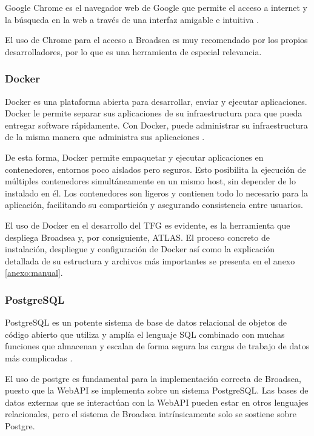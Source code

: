 Google Chrome es el navegador web de Google que permite el acceso a internet y la búsqueda en la web a través de una interfaz amigable e intuitiva \cite{GoogleChrome}. 

El uso de Chrome para el acceso a Broadsea es muy recomendado por los propios desarrolladores, por lo que es una herramienta de especial relevancia.

\subsubsection{Docker}

Docker es una plataforma abierta para desarrollar, enviar y ejecutar aplicaciones. Docker le permite separar sus aplicaciones de su infraestructura para que pueda entregar software rápidamente. Con Docker, puede administrar su infraestructura de la misma manera que administra sus aplicaciones \cite{DockerWebsite}.

De esta forma, Docker permite empaquetar y ejecutar aplicaciones en contenedores, entornos poco aislados pero seguros. Esto posibilita la ejecución de múltiples contenedores simultáneamente en un mismo host, sin depender de lo instalado en él. Los contenedores son ligeros y contienen todo lo necesario para la aplicación, facilitando su compartición y asegurando consistencia entre usuarios. 

El uso de Docker en el desarrollo del TFG es evidente, es la herramienta que despliega Broadsea y, por consiguiente, ATLAS. El proceso concreto de instalación, despliegue y configuración de Docker así como la explicación detallada de su estructura y archivos más importantes se presenta en el anexo \ref{anexo:manual}.

\subsubsection{PostgreSQL}

PostgreSQL es un potente sistema de base de datos relacional de objetos de código abierto que utiliza y amplía el lenguaje SQL combinado con muchas funciones que almacenan y escalan de forma segura las cargas de trabajo de datos más complicadas \cite{PostgreWebsite}.

El uso de postgre es fundamental para la implementación correcta de Broadsea, puesto que la WebAPI se implementa sobre un sistema PostgreSQL. Las bases de datos externas que se interactúan con la WebAPI pueden estar en otros lenguajes relacionales, pero el sistema de Broadsea intrínsicamente solo se sostiene sobre Postgre.

